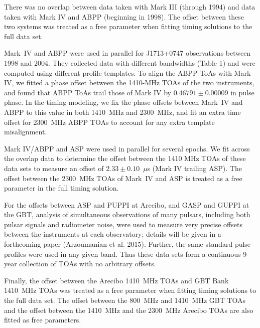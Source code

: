 There was no overlap between data taken with Mark III (through 1994) and
data taken with Mark IV and ABPP (beginning in 1998).  The offset between
these two systems was treated as a free parameter when fitting timing
solutions to the full data set.

Mark~IV and ABPP were used in parallel for J1713+0747 observations between
1998 and 2004. They collected data with different bandwidths (Table 1) and
were computed using different profile templates. To align the ABPP ToAs
with Mark IV, we fitted a phase offset between the 1410-MHz TOAs of the
two instruments, and found that ABPP ToAs trail those of Mark IV
by $0.46791\pm0.00009$ in pulse phase. In the timing modeling, we fix
the phase offsets between Mark~IV and ABPP to this value in
both 1410~MHz and 2300~MHz, and fit an extra time offset for 2300~MHz ABPP 
TOAs to account for any extra template misalignment.


Mark IV/ABPP and ASP were used in parallel for several epochs.  We fit
across the overlap data to determine the offset between the 1410 MHz
TOAs of these data sets to measure an offset of $2.33\pm0.10$~$\mu$s
(Mark IV trailing ASP). The offset between the 2300~MHz TOAs of Mark~IV 
and ASP is treated as a free parameter in the full timing solution.

For the offsets between ASP and PUPPI at Arecibo, and GASP and GUPPI
at the GBT, analysis of simultaneous observations of many pulsars,
including both pulsar signals and radiometer noise, were used to
measure very precise offsets between the instruments at each
observatory; details will be given in a forthcoming paper (Arzoumanian
et al. 2015).  Further, the same standard pulse profiles were used in
any given band.  Thus these data sets form a continuous 9-year
collection of TOAs with no arbitrary offsets.

Finally, the offset between the Arecibo 1410~MHz TOAs and GBT Bank 1410~MHz TOAs 
 was treated as a free parameter when fitting timing solutions to the full data set.  
The offset between the 800~MHz and 1410~MHz GBT TOAs and the offset between
the 1410~MHz and the 2300~MHz Arecibo TOAs are also fitted as free
parameters.  


